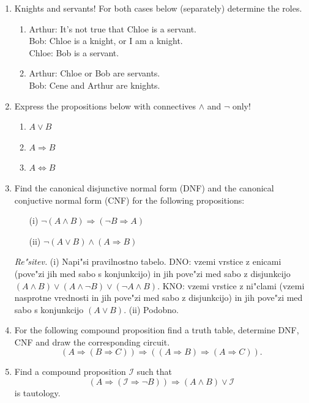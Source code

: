 \documentclass[11pt,paper=b5,footinclude,headinclude]{scrbook} %
\theoremstyle{remark}
\theoremstyle{definition} %
\theoremstyle{theorem} %
\begin{document}
\begin{enumerate}
\begin{enumerate}
\end{enumerate}
\item Knights and servants! For both cases below (separately) determine
the roles.
\begin{enumerate}
\item Arthur: It's not true that Chloe is a servant.\\
Bob: Chloe is a knight, or I am a knight.\\
Chloe: Bob is a servant.
\item Arthur: Chloe or Bob are servants.\\
Bob: Cene and Arthur are knights.
\end{enumerate}
\item Express the propositions below with connectives $\wedge$ and $\neg$
only!
\begin{enumerate}
\item $A\vee B$
\item $A\Rightarrow B$
\item $A\Leftrightarrow B$
\end{enumerate}


\item Find the canonical disjunctive normal form (DNF) and the canonical conjuctive normal form (CNF) for the following propositions:
\begin{enumerate}
\item[(i)] $\neg(A\wedge B) \Rightarrow (\neg B \Rightarrow A)$
\item[(ii)] $\neg (A\vee B) \wedge (A \Rightarrow B)$
\end{enumerate}

\emph{Re"sitev.} (i) Napi"si pravilnostno tabelo. DNO: vzemi vrstice z enicami (pove"zi jih med sabo s konjunkcijo) in jih pove"zi med sabo z disjunkcijo
$(A\wedge B) \vee (A\wedge \neg B) \vee (\neg A \wedge B)$. KNO: vzemi vrstice z ni"clami (vzemi nasprotne vrednosti in jih pove"zi med sabo z disjunkcijo) in jih pove"zi med sabo s konjunkcijo $(A \vee B)$. (ii) Podobno.

\item For the following compound proposition find  a truth table, determine DNF, CNF and draw the corresponding circuit.
$$
(A \Rightarrow (B\Rightarrow C)) \Rightarrow ((A\Rightarrow B)\Rightarrow (A \Rightarrow C)).
$$


\item Find a compound proposition $\mathcal{I}$ such that
$$(A\Rightarrow (\mathcal{I} \Rightarrow \neg B))\Rightarrow (A\wedge B) \vee \mathcal{I}$$
is tautology.


\end{enumerate}
\end{document}
